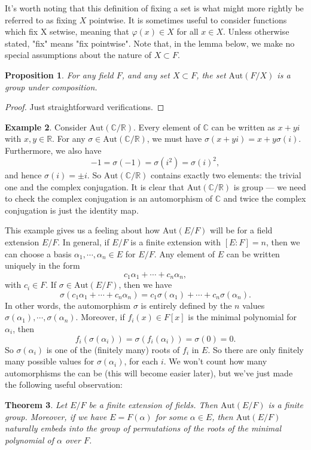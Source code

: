 \documentclass[12pt]{report}
\newtheorem{thm}{Theorem}[section]
\newtheorem{prop}[thm]{Proposition}
{\theoremstyle{remark}\newtheorem*{remark}{Remark}}
\theoremstyle{definition}
\newtheorem{example}[thm]{Example}
\def\CC{\mathbb{C}}
\def\RR{\mathbb{R}}
\def\Aut{\text{Aut}}
\def\aa{\alpha}
\begin{document}
It's worth noting that this definition of fixing a set is what might more
rightly be referred to as fixing $X$ pointwise. It is sometimes useful to consider functions which fix X setwise, meaning that $\varphi(x) \in X$ for all $x \in X$. Unless otherwise stated, "fix" means "fix pointwise".
Note that, in the lemma below, we make no special assumptions about
the nature of $X \subset F$.

\begin{prop}
    For any field $F$, and any set $X \subset F$, the set $\Aut(F/X)$ is a group under composition.
\end{prop}

\begin{proof}
    Just straightforward verifications.
\end{proof}

\begin{example}
    Consider $\Aut(\CC/\RR)$. Every element of $\CC$ can be written as $x+yi$ with $x,y\in\RR$. For any $\sigma\in \Aut(\CC/\RR)$, we must have $\sigma(x+yi)=x+y\sigma(i)$. Furthermore, we also have $$-1=\sigma(-1)=\sigma(i^2)=\sigma(i)^2,$$ and hence $\sigma(i)=\pm i$. So $\Aut(\CC/\RR)$ contains exactly two elements: the trivial one and the complex conjugation. It is clear that $\Aut(\CC/\RR)$ is group --- we need to check the complex conjugation is an automorphism of $\CC$ and twice the complex conjugation is just the identity map.
\end{example}

This example gives us a feeling about how $\Aut(E/F)$ will be for a field extension $E/F$. In general, if $E/F$ is a finite extension with $[E:F] = n$, then we can choose a basis $\aa_1,\cdots,\aa_n\in E$ for $E/F$. Any element of $E$ can be written uniquely in the form $$c_1\aa_1+\cdots+c_n\aa_n,$$ with $c_i\in F$. If $\sigma\in\Aut(E/F)$, then we have $$\sigma(c_1\aa_1+\cdots+c_n\aa_n)=c_1\sigma(\aa_1)+\cdots+c_n\sigma(\aa_n).$$  In other words, the automorphism $\sigma$ is entirely defined by the $n$ values $\sigma(\aa_1),\cdots,\sigma(\aa_n)$. Moreover, if $f_i(x) \in F[x]$ is the minimal polynomial for $\aa_i$, then $$f_i(\sigma(\aa_i)) = \sigma(f_i(\aa_i)) = \sigma(0) = 0.$$
So $\sigma(\aa_i)$ is one of the (finitely many) roots of $f_i$ in $E$. So there are only finitely many possible values for $\sigma(\aa_i)$, for each $i$. We won't count how many automorphisms the can be (this will become easier later), but we've just made the following useful observation:

\begin{thm}
    Let $E/F$ be a finite extension of fields. Then $\Aut(E/F)$ is a finite group. Moreover, if we have $E = F(\aa)$ for some $\aa \in E$, then $\Aut(E/F)$ naturally embeds into the group of permutations of the roots of the minimal polynomial of $\aa$ over $F$.
\end{thm}
\end{document}
